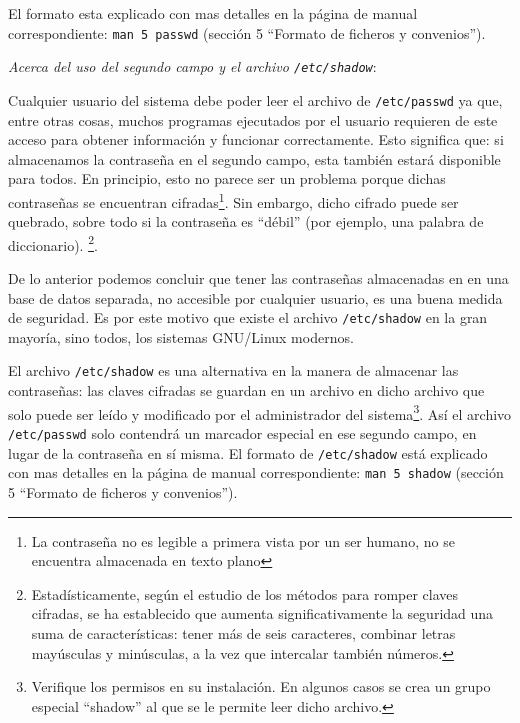 \documentclass[12pt]{article}
\begin{document}
El formato esta explicado con mas detalles en la página de manual correspondiente: 
\texttt{man 5 passwd} (sección 5 ``Formato de ficheros y convenios'').

\textit{Acerca del uso del segundo campo y el archivo \texttt{/etc/shadow}}: 

Cualquier usuario del sistema debe poder leer el archivo de \texttt{/etc/passwd}
ya que, entre otras cosas, muchos programas ejecutados por el usuario requieren de este acceso 
para obtener información y funcionar correctamente. Esto significa que: si almacenamos 
la contraseña en el segundo campo, esta también estará disponible para todos. En principio, 
esto no parece ser un problema porque dichas contraseñas se encuentran cifradas\footnote{La 
contraseña no es legible a primera vista por un ser humano, no se encuentra almacenada en 
texto plano}.  
Sin embargo, dicho cifrado puede ser quebrado, sobre todo si la contraseña es ``débil'' (por ejemplo, 
una palabra de diccionario).  \footnote{Estadísticamente, según el estudio de
los métodos para romper claves cifradas, se ha establecido que aumenta
significativamente la seguridad una suma de características: tener más de seis
caracteres, combinar letras mayúsculas y minúsculas, a la vez que intercalar
también números.}. 



De lo anterior podemos concluir que tener las contraseñas almacenadas en 
en una base de datos separada, 
no accesible por cualquier usuario, es una buena medida de seguridad. Es por este motivo 
que existe el archivo \texttt{/etc/shadow} en la gran mayoría, sino todos, los sistemas
GNU/Linux modernos.  

El archivo \texttt{/etc/shadow} es una alternativa en la manera de
almacenar las contraseñas: las claves cifradas se guardan en un archivo
en dicho archivo que solo puede ser leído y modificado por el administrador del 
sistema\footnote{Verifique los permisos en su instalación. En algunos casos se crea 
un grupo especial ``shadow'' al que se le permite leer dicho archivo.}. Así el 
archivo \texttt{/etc/passwd} solo contendrá un marcador especial en ese segundo campo, en 
lugar de la contraseña en sí misma. 
El formato de \texttt{/etc/shadow} está explicado con mas detalles en la página de 
manual correspondiente: \texttt{man 5 shadow} (sección 5 ``Formato de ficheros y convenios'').
\end{document}
